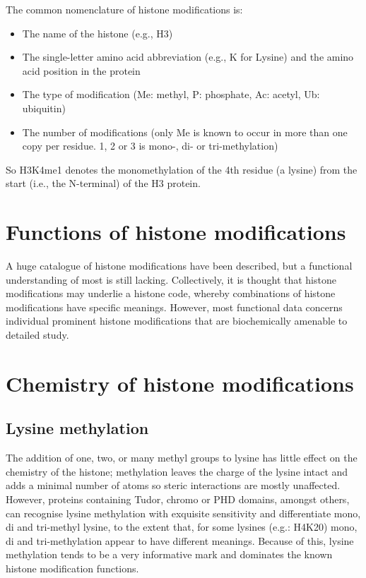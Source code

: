 The common nomenclature of histone modifications is:

\begin{itemize}
\tightlist
\item
  The name of the histone (e.g., H3)
\item
  The single-letter amino acid abbreviation (e.g., K for Lysine) and the amino acid position in the protein
\item
  The type of modification (Me: methyl, P: phosphate, Ac: acetyl, Ub: ubiquitin)
\item
  The number of modifications (only Me is known to occur in more than one copy per residue. 1, 2 or 3 is mono-, di- or tri-methylation)
\end{itemize}

So H3K4me1 denotes the monomethylation of the 4th residue (a lysine) from the start (i.e., the N-terminal) of the H3 protein.

\hypertarget{functions-of-histone-modifications}{%
\section{Functions of histone modifications}\label{functions-of-histone-modifications}}

A huge catalogue of histone modifications have been described, but a functional understanding of most is still lacking. Collectively, it is thought that histone modifications may underlie a histone code, whereby combinations of histone modifications have specific meanings. However, most functional data concerns individual prominent histone modifications that are biochemically amenable to detailed study.

\hypertarget{chemistry-of-histone-modifications}{%
\section{Chemistry of histone modifications}\label{chemistry-of-histone-modifications}}

\hypertarget{lysine-methylation}{%
\subsection{Lysine methylation}\label{lysine-methylation}}

The addition of one, two, or many methyl groups to lysine has little effect on the chemistry of the histone; methylation leaves the charge of the lysine intact and adds a minimal number of atoms so steric interactions are mostly unaffected. However, proteins containing Tudor, chromo or PHD domains, amongst others, can recognise lysine methylation with exquisite sensitivity and differentiate mono, di and tri-methyl lysine, to the extent that, for some lysines (e.g.: H4K20) mono, di and tri-methylation appear to have different meanings. Because of this, lysine methylation tends to be a very informative mark and dominates the known histone modification functions.

